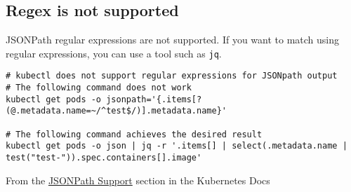 \documentclass[a4paper,landscape]{article}
\begin{document}
\subsection{Regex is not supported}
\label{sec:org17e7e19}

JSONPath regular expressions are not supported. If you want to match
using regular expressions, you can use a tool such as \texttt{jq}.

\begin{verbatim}
# kubectl does not support regular expressions for JSONpath output
# The following command does not work
kubectl get pods -o jsonpath='{.items[?(@.metadata.name=~/^test$/)].metadata.name}'

# The following command achieves the desired result
kubectl get pods -o json | jq -r '.items[] | select(.metadata.name | test("test-")).spec.containers[].image'
\end{verbatim}

From the \href{https://kubernetes.io/docs/reference/\_print/\#pg-a938176c695852fe70362c29cf615f1c}{JSONPath Support} section in the Kubernetes Docs
\end{document}
